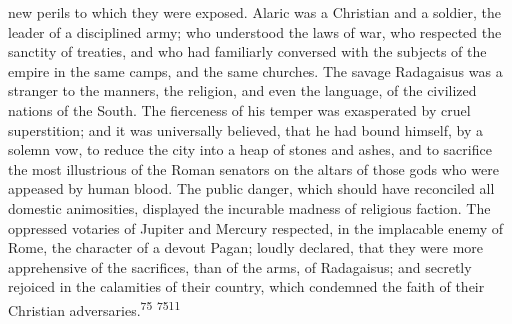 new perils to which they were exposed. Alaric was a Christian and
a soldier, the leader of a disciplined army; who understood the
laws of war, who respected the sanctity of treaties, and who had
familiarly conversed with the subjects of the empire in the same
camps, and the same churches. The savage Radagaisus was a
stranger to the manners, the religion, and even the language, of
the civilized nations of the South. The fierceness of his temper
was exasperated by cruel superstition; and it was universally
believed, that he had bound himself, by a solemn vow, to reduce
the city into a heap of stones and ashes, and to sacrifice the
most illustrious of the Roman senators on the altars of those
gods who were appeased by human blood. The public danger, which
should have reconciled all domestic animosities, displayed the
incurable madness of religious faction. The oppressed votaries of
Jupiter and Mercury respected, in the implacable enemy of Rome,
the character of a devout Pagan; loudly declared, that they were
more apprehensive of the sacrifices, than of the arms, of
Radagaisus; and secretly rejoiced in the calamities of their
country, which condemned the faith of their Christian
adversaries.\textsuperscript{75} \textsuperscript{7511}





